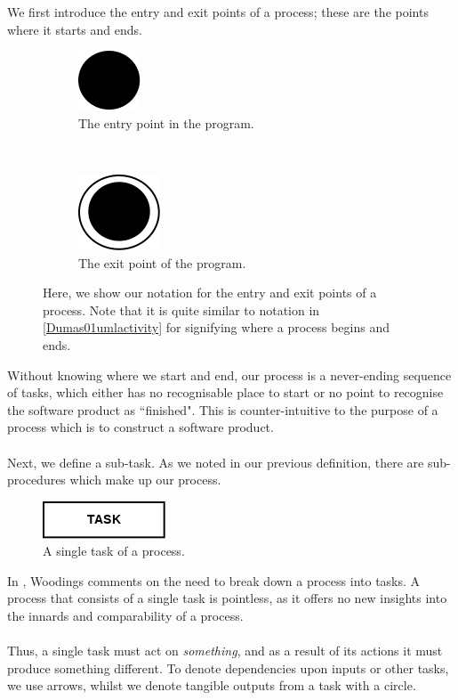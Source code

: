 We first introduce the entry and exit points of a process; these are the points where it starts and
ends.

\begin{figure}[h!]
\centering
\begin{subfigure}[b]{.45\textwidth}
\centering
\includegraphics[scale=0.6]{media/Entry}
\caption{The entry point in the program.}
\label{entryFigure}
\end{subfigure}
~
\begin{subfigure}[b]{.45\textwidth}
\centering
\includegraphics[scale=0.6]{media/Exit}
\caption{The exit point of the program.}
\label{exitFigure}
\end{subfigure}
\caption{Here, we show our notation for the entry and exit points of a process.
Note that it is quite similar to notation in \ref{Dumas01umlactivity} for
  signifying where a process begins and ends.}
\label{entryExitFigure}
\end{figure}

Without knowing where we start and end, our process is a never-ending sequence of tasks, which
either has no recognisable place to start or no point to recognise the software product as
``finished".
This is counter-intuitive to the purpose of a process which is to construct a software product.\\
\\
Next, we define a sub-task.
As we noted in our previous definition, there are sub-procedures which make up our process.

\begin{figure}[h!]
\centering
\includegraphics[scale=0.6]{media/Task}
\caption{A single task of a process.}
\label{taskFigure}
\end{figure}

In \cite{Woodings2013Tut1}, Woodings comments on the need to break down a
process into tasks.
A process that consists of a single task is pointless, as it offers no new
insights into the innards and comparability of a process.\\
\\
Thus, a single task must act on {\em something}, and as a result of its actions
it must produce something different.
To denote dependencies upon inputs or other tasks, we use arrows, whilst we denote tangible outputs
from a task with a circle.

